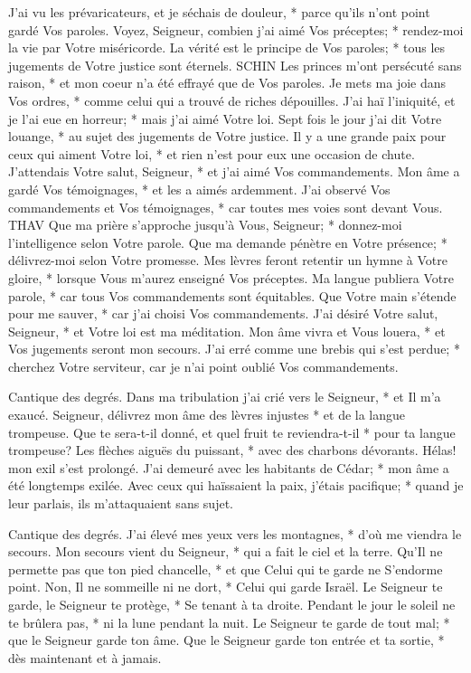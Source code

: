 J'ai vu les prévaricateurs, et je séchais de douleur, * parce qu'ils n'ont point gardé Vos paroles.
Voyez, Seigneur, combien j'ai aimé Vos préceptes; * rendez-moi la vie par Votre miséricorde.
La vérité est le principe de Vos paroles; * tous les jugements de Votre justice sont éternels.
SCHIN
Les princes m'ont persécuté sans raison, * et mon coeur n'a été effrayé que de Vos paroles.
Je mets ma joie dans Vos ordres, * comme celui qui a trouvé de riches dépouilles.
J'ai haï l'iniquité, et je l'ai eue en horreur; * mais j'ai aimé Votre loi.
Sept fois le jour j'ai dit Votre louange, * au sujet des jugements de Votre justice.
Il y a une grande paix pour ceux qui aiment Votre loi, * et rien n'est pour eux une occasion de chute.
J'attendais Votre salut, Seigneur, * et j'ai aimé Vos commandements.
Mon âme a gardé Vos témoignages, * et les a aimés ardemment.
J'ai observé Vos commandements et Vos témoignages, * car toutes mes voies sont devant Vous.
THAV
Que ma prière s'approche jusqu'à Vous, Seigneur; * donnez-moi l'intelligence selon Votre parole.
Que ma demande pénètre en Votre présence; * délivrez-moi selon Votre promesse.
Mes lèvres feront retentir un hymne à Votre gloire, * lorsque Vous m'aurez enseigné Vos préceptes.
Ma langue publiera Votre parole, * car tous Vos commandements sont équitables.
Que Votre main s'étende pour me sauver, * car j'ai choisi Vos commandements.
J'ai désiré Votre salut, Seigneur, * et Votre loi est ma méditation.
Mon âme vivra et Vous louera, * et Vos jugements seront mon secours.
J'ai erré comme une brebis qui s'est perdue; * cherchez Votre serviteur, car je n'ai point oublié Vos commandements.

Cantique des degrés. Dans ma tribulation j'ai crié vers le Seigneur, * et Il m'a exaucé.
Seigneur, délivrez mon âme des lèvres injustes * et de la langue trompeuse.
Que te sera-t-il donné, et quel fruit te reviendra-t-il * pour ta langue trompeuse?
Les flèches aiguës du puissant, * avec des charbons dévorants.
Hélas! mon exil s'est prolongé. J'ai demeuré avec les habitants de Cédar; *
mon âme a été longtemps exilée.
Avec ceux qui haïssaient la paix, j'étais pacifique; * quand je leur parlais, ils m'attaquaient sans sujet.

Cantique des degrés. J'ai élevé mes yeux vers les montagnes, * d'où me viendra le secours.
Mon secours vient du Seigneur, * qui a fait le ciel et la terre.
Qu'Il ne permette pas que ton pied chancelle, * et que Celui qui te garde ne S'endorme point.
Non, Il ne sommeille ni ne dort, * Celui qui garde Israël.
Le Seigneur te garde, le Seigneur te protège, * Se tenant à ta droite.
Pendant le jour le soleil ne te brûlera pas, * ni la lune pendant la nuit.
Le Seigneur te garde de tout mal; * que le Seigneur garde ton âme.
Que le Seigneur garde ton entrée et ta sortie, * dès maintenant et à jamais.

